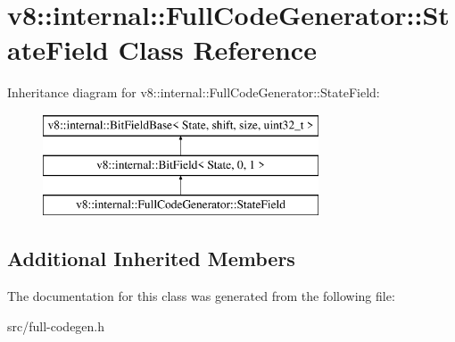 \hypertarget{classv8_1_1internal_1_1_full_code_generator_1_1_state_field}{}\section{v8\+:\+:internal\+:\+:Full\+Code\+Generator\+:\+:State\+Field Class Reference}
\label{classv8_1_1internal_1_1_full_code_generator_1_1_state_field}
Inheritance diagram for v8\+:\+:internal\+:\+:Full\+Code\+Generator\+:\+:State\+Field\+:\begin{figure}[H]
\begin{center}
\leavevmode
\includegraphics[height=3.000000cm]{classv8_1_1internal_1_1_full_code_generator_1_1_state_field}
\end{center}
\end{figure}
\subsection*{Additional Inherited Members}


The documentation for this class was generated from the following file\+:\begin{DoxyCompactItemize}
\item 
src/full-\/codegen.\+h\end{DoxyCompactItemize}
